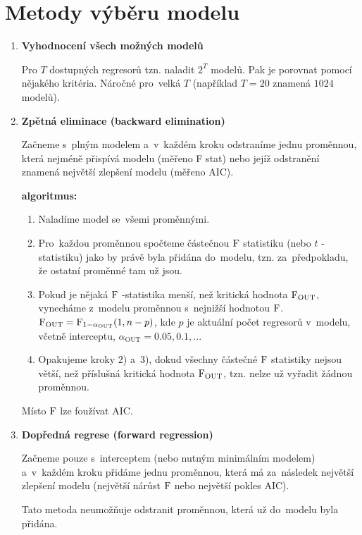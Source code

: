 \section{Metody výběru modelu}

\begin{enumerate}[1)]

\item
\textbf{Vyhodnocení všech možných modelů}

Pro $T$ dostupných regresorů tzn. naladit $2^T$ modelů. Pak je porovnat pomocí nějakého kritéria. Náročné pro~velká $T$ (například $T = 20$ znamená $1024$ modelů).

\item
\textbf{Zpětná eliminace (backward elimination)}

Začneme s~plným modelem a~v~každém kroku odstraníme jednu proměnnou, která nejméně přispívá modelu (měřeno F stat) nebo jejíž odstranění znamená největší zlepšení modelu (měřeno AIC).

\textbf{algoritmus:}
\begin{enumerate}[	1)]
	\item Naladíme model se~všemi proměnnými.
	\item Pro~každou proměnnou spočteme částečnou $\mathrm{F}$ statistiku (nebo $t$ -statistiku) jako by právě byla přidána do~modelu, tzn. za~předpokladu, že ostatní proměnné tam už jsou.
	\item Pokud je nějaká $\mathrm{F}$ -statistika menší, než kritická hodnota $\mathrm{F}_\mathrm{OUT}$, vynecháme z~modelu proměnnou s~nejnižší hodnotou $\mathrm{F}$. $\mathrm{F}_\mathrm{OUT} = \mathrm{F}_{1-\alpha_\mathrm{OUT}}(1,n-p)$, kde $p$ je aktuální počet regresorů v~modelu, včetně interceptu, $\alpha_\text{OUT} = 0.05,0.1,...$
	\item Opakujeme kroky 2) a~3), dokud všechny částečné $\mathrm{F}$ statistiky nejsou větší, než příslušná kritická hodnota $\mathrm{F}_\mathrm{OUT}$, tzn. nelze už vyřadit žádnou proměnnou.
\end{enumerate}
\begin{remark}
	Místo $\mathrm{F}$ lze foužívat AIC.
\end{remark}

\item
\textbf{Dopředná regrese (forward regression)}

Začneme pouze s~interceptem (nebo nutným minimálním modelem) a~v~každém kroku přidáme jednu proměnnou, která má za~následek největší zlepšení modelu (největší nárůst $\mathrm{F}$ nebo největší pokles AIC).

Tato metoda neumožňuje odstranit proměnnou, která už do~modelu byla přidána.


\end{enumerate}
